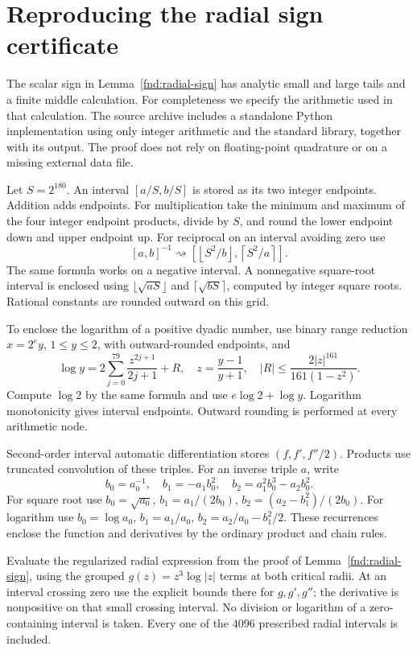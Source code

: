 \documentclass[11pt,a4paper]{amsart}
\theoremstyle{definition}
\theoremstyle{remark}
\numberwithin{equation}{section}
\begin{document}
\section{Reproducing the radial sign certificate}\label{app:sign}
The scalar sign in Lemma~\ref{fnd:radial-sign} has analytic small and large tails and a finite middle calculation. For completeness we specify the arithmetic used in that calculation. The source archive includes a standalone Python implementation using only integer arithmetic and the standard library, together with its output. The proof does not rely on floating-point quadrature or on a missing external data file.

Let $S=2^{180}$. An interval $[a/S,b/S]$ is stored as its two integer endpoints. Addition adds endpoints. For multiplication take the minimum and maximum of the four integer endpoint products, divide by $S$, and round the lower endpoint down and upper endpoint up. For reciprocal on an interval avoiding zero use
\[
 [a,b]^{-1}\rightsquigarrow
 \left[\left\lfloor S^2/b\right\rfloor,
       \left\lceil S^2/a\right\rceil\right].
\]
The same formula works on a negative interval. A nonnegative square-root interval is enclosed using $\lfloor\sqrt{aS}\rfloor$ and $\lceil\sqrt{bS}\rceil$, computed by integer square roots. Rational constants are rounded outward on this grid.

To enclose the logarithm of a positive dyadic number, use binary range reduction $x=2^e y$, $1\le y\le2$, with outward-rounded endpoints, and
\[
 \log y=2\sum_{j=0}^{79}\frac{z^{2j+1}}{2j+1}+R,
 \quad z=\frac{y-1}{y+1},\quad
 |R|\le\frac{2|z|^{161}}{161(1-z^2)}.
\]
Compute $\log2$ by the same formula and use $e\log2+\log y$. Logarithm monotonicity gives interval endpoints. Outward rounding is performed at every arithmetic node.

Second-order interval automatic differentiation stores
$(f,f',f''/2)$. Products use truncated convolution of these triples. For an inverse triple $a$, write
\[
 b_0=a_0^{-1},\quad b_1=-a_1b_0^2,\quad
 b_2=a_1^2b_0^3-a_2b_0^2.
\]
For square root use $b_0=\sqrt{a_0}$,
$b_1=a_1/(2b_0)$, $b_2=(a_2-b_1^2)/(2b_0)$.
For logarithm use
$b_0=\log a_0$, $b_1=a_1/a_0$,
$b_2=a_2/a_0-b_1^2/2$.
These recurrences enclose the function and derivatives by the ordinary product and chain rules.

Evaluate the regularized radial expression from the proof of Lemma~\ref{fnd:radial-sign}, using the grouped $g(z)=z^3\log|z|$ terms at both critical radii. At an interval crossing zero use the explicit bounds there for $g,g',g''$; the derivative is nonpositive on that small crossing interval. No division or logarithm of a zero-containing interval is taken. Every one of the $4096$ prescribed radial intervals is included.
\end{document}
